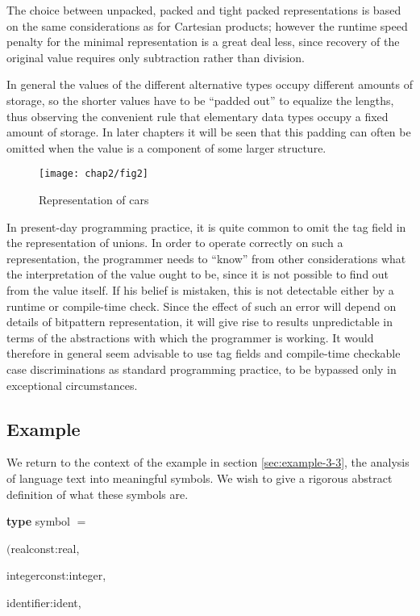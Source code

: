 The choice between unpacked, packed and tight packed representations is based on the same considerations as for Cartesian products; however the runtime speed penalty for the minimal representation is a great deal less, since recovery of the original value requires only subtraction rather than division.

In general the values of the different alternative types occupy different amounts of storage, so the shorter values have to be ``padded out'' to equalize the lengths, thus observing the convenient rule that elementary data types occupy a fixed amount of storage. In later chapters it will be seen that this padding can often be omitted when the value is a component of some larger structure.

\begin{figure}[ht!]
	\centering
	\texttt{[image: chap2/fig2]}
	\caption{Representation of cars}
\end{figure}

In present-day programming practice, it is quite common to omit the tag field in the representation of unions. In order to operate correctly on such a representation, the programmer needs to ``know'' from other considerations what the interpretation of the value ought to be, since it is not possible to find out from the value itself. If his belief is mistaken, this is not detectable either by a runtime or compile-time check. Since the effect of such an error will depend on details of bitpattern representation, it will give rise to results unpredictable in terms of the abstractions with which the programmer is working. It would therefore in general seem advisable to use tag fields and compile-time checkable case discriminations as standard programming practice, to be bypassed only in exceptional circumstances.

\subsection{Example}

We return to the context of the example in section \ref{sec:example-3-3}, the analysis of language text into meaningful symbols. We wish to give a rigorous abstract definition of what these symbols are.

\quad \textbf{type} symbol $=$

\tabto*{5.6em}$($realconst:real,

\tabto*{6em}integerconst:integer,

\tabto*{6em}identifier:ident,

